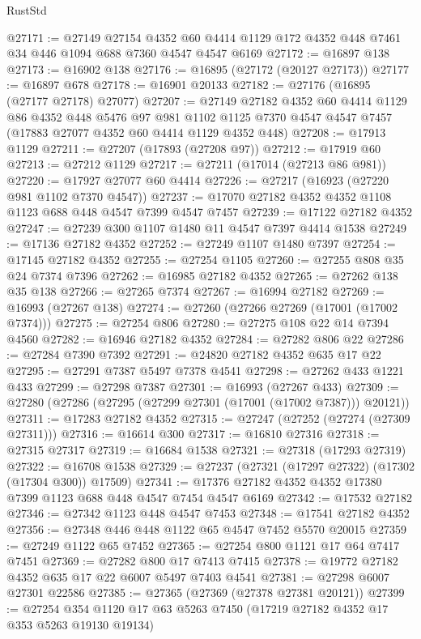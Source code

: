 \begin{lexlean}{RustStd}
\begin{coremodule}
{\begin{coremodule}
{{{{{{{{{{{{{{{{{{{{{{{{{{{{{{{{{{{{{{{{{{{{{{{{{{{{{{{@27171 := @27149
    @27154
    @4352
    @60
    @4414
    @1129
    @172
    @4352
    @448
    @7461
    @34
    @446
    @1094
    @688
    @7360
    @4547
    @4547
    @6169
@27172 := @16897 @138
@27173 := @16902 @138
@27176 := @16895 (@27172 (@20127 @27173))
@27177 := @16897 @678
@27178 := @16901 @20133
@27182 := @27176 (@16895 (@27177 @27178) @27077)
@27207 := @27149
    @27182
    @4352
    @60
    @4414
    @1129
    @86
    @4352
    @448
    @5476
    @97
    @981
    @1102
    @1125
    @7370
    @4547
    @4547
    @7457
    (@17883 @27077 @4352 @60 @4414 @1129 @4352 @448)
@27208 := @17913 @1129
@27211 := @27207 (@17893 (@27208 @97))
@27212 := @17919 @60
@27213 := @27212 @1129
@27217 := @27211 (@17014 (@27213 @86 @981))
@27220 := @17927 @27077 @60 @4414
@27226 := @27217 (@16923 (@27220 @981 @1102 @7370 @4547))
@27237 := @17070 @27182 @4352 @4352 @1108 @1123 @688 @448 @4547 @7399 @4547 @7457
@27239 := @17122 @27182 @4352
@27247 := @27239 @300 @1107 @1480 @11 @4547 @7397 @4414 @1538
@27249 := @17136 @27182 @4352
@27252 := @27249 @1107 @1480 @7397
@27254 := @17145 @27182 @4352
@27255 := @27254 @1105
@27260 := @27255 @808 @35 @24 @7374 @7396
@27262 := @16985 @27182 @4352
@27265 := @27262 @138 @35 @138
@27266 := @27265 @7374
@27267 := @16994 @27182
@27269 := @16993 (@27267 @138)
@27274 := @27260 (@27266 @27269 (@17001 (@17002 @7374)))
@27275 := @27254 @806
@27280 := @27275 @108 @22 @14 @7394 @4560
@27282 := @16946 @27182 @4352
@27284 := @27282 @806 @22
@27286 := @27284 @7390 @7392
@27291 := @24820 @27182 @4352 @635 @17 @22
@27295 := @27291 @7387 @5497 @7378 @4541
@27298 := @27262 @433 @1221 @433
@27299 := @27298 @7387
@27301 := @16993 (@27267 @433)
@27309 := @27280 (@27286 (@27295 (@27299 @27301 (@17001 (@17002 @7387))) @20121))
@27311 := @17283 @27182 @4352
@27315 := @27247 (@27252 (@27274 (@27309 @27311)))
@27316 := @16614 @300
@27317 := @16810 @27316
@27318 := @27315 @27317
@27319 := @16684 @1538
@27321 := @27318 (@17293 @27319)
@27322 := @16708 @1538
@27329 := @27237 (@27321 (@17297 @27322) (@17302 (@17304 @300)) @17509)
@27341 := @17376 @27182 @4352 @4352 @17380 @7399 @1123 @688 @448 @4547 @7454 @4547 @6169
@27342 := @17532 @27182
@27346 := @27342 @1123 @448 @4547 @7453
@27348 := @17541 @27182 @4352
@27356 := @27348 @446 @448 @1122 @65 @4547 @7452 @5570 @20015
@27359 := @27249 @1122 @65 @7452
@27365 := @27254 @800 @1121 @17 @64 @7417 @7451
@27369 := @27282 @800 @17 @7413 @7415
@27378 := @19772 @27182 @4352 @635 @17 @22 @6007 @5497 @7403 @4541
@27381 := @27298 @6007 @27301 @22586
@27385 := @27365 (@27369 (@27378 @27381 @20121))
@27399 := @27254 @354 @1120 @17 @63 @5263 @7450 (@17219 @27182 @4352 @17 @353 @5263 @19130 @19134)
}}}}}}}}}}}}}}}}}}}}}}}}}}}}}}}}}}}}}}}}}}}}}}}}}}}}}}}
\end{coremodule}}
\end{coremodule}
\end{lexlean}
